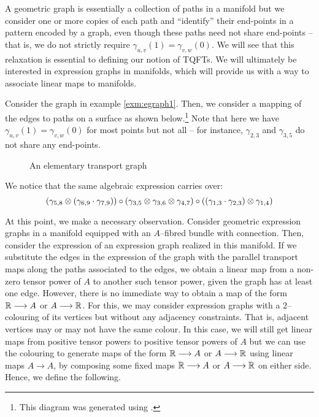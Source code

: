 \documentclass[./Thick_TQFTs_and_Quantum_Information.tex]{subfiles}
\begin{document}
\begin{rmk}
A geometric graph is essentially a collection of paths in a manifold but we
consider one or more copies of each path and ``identify'' their end-points in a
pattern encoded by a graph, even though these paths need not share end-points --
that is, we do not strictly require $\gamma_{u, v}(1) = \gamma_{v, w}(0)$. We
will see that this relaxation is essential to defining our notion of TQFTs. We
will ultimately be interested in expression graphs in manifolds, which will
provide us with a way to associate linear maps to manifolds.
\end{rmk}

\begin{exm}\label{exm:geomegraph}
Consider the graph in example \ref{exm:egraph1}. Then, we consider a mapping of
the edges to paths on a surface as shown below.\footnote{This diagram was
generated using \cite{Mathcha}.} Note that here we have
$\gamma_{u, v}(1) = \gamma_{v, w}(0)$ for most points but not all -- for
instance, $\gamma_{2, 3}$ and $\gamma_{3, 5}$ do not share any end-points.
\begin{figure}[H]
\begin{center}

\end{center}
\caption{An elementary transport graph}
\end{figure}
We notice that the same algebraic expression carries over:
\[
  (\gamma_{5, 8} \otimes (\gamma_{6, 9} \cdot \gamma_{7, 9})) \circ
  (\gamma_{3, 5} \otimes \gamma_{3, 6} \otimes \gamma_{4, 7}) \circ
  ((\gamma_{1, 3} \cdot \gamma_{2, 3}) \otimes \gamma_{1, 4})
\]
\end{exm}

At this point, we make a necessary observation. Consider geometric expression
graphs in a manifold equipped with an $A$--fibred bundle with connection. Then,
consider the expression of an expression graph realized in this manifold. If we
substitute the edges in the expression of the graph with the parallel transport
maps along the paths associated to the edges, we obtain a linear map from a
non-zero tensor power of $A$ to another such tensor power, given the graph has
at least one edge. However, there is no immediate way to obtain a map of the
form $\mathbb{R} \stackrel{}{\longrightarrow} A$ or $A \stackrel{}{\longrightarrow} \mathbb{R}$. For this, we may consider expression graphs with
a $2$--colouring of its vertices but without any adjacency constraints. That is,
adjacent vertices may or may not have the same colour. In this case, we will
still get linear maps from positive tensor powers to positive tensor powers of
$A$ but we can use the colouring to generate maps of the form $\mathbb{R} \stackrel{}{\longrightarrow} A$ or
$A \stackrel{}{\longrightarrow} \mathbb{R}$ using linear maps $A \to A$, by composing some fixed maps
$\mathbb{R} \stackrel{}{\longrightarrow} A$ or $A \stackrel{}{\longrightarrow} \mathbb{R}$ on either side. Hence, we define the following.
\end{document}

